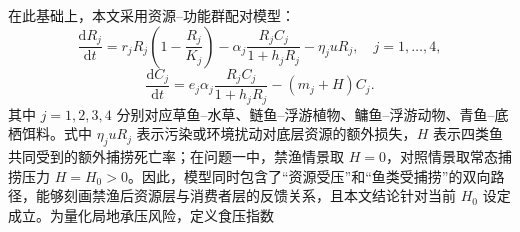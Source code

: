 \documentclass{MMCStyle}
\begin{document}
在此基础上，本文采用资源--功能群配对模型：
\begin{equation}
\frac{\mathrm{d}R_j}{\mathrm{d}t}
=r_j R_j\left(1-\frac{R_j}{K_j}\right)-\alpha_j\frac{R_j C_j}{1+h_jR_j}-\eta_j u R_j,\quad j=1,\dots,4,
\end{equation}
\begin{equation}
\frac{\mathrm{d}C_j}{\mathrm{d}t}
=e_j\alpha_j\frac{R_j C_j}{1+h_jR_j}-(m_j+H)C_j.
\end{equation}
其中 $j=1,2,3,4$ 分别对应草鱼--水草、鲢鱼--浮游植物、鳙鱼--浮游动物、青鱼--底栖饵料。式中 $\eta_j u R_j$ 表示污染或环境扰动对底层资源的额外损失，$H$ 表示四类鱼共同受到的额外捕捞死亡率；在问题一中，禁渔情景取 $H=0$，对照情景取常态捕捞压力 $H=H_0>0$。因此，模型同时包含了“资源受压”和“鱼类受捕捞”的双向路径，能够刻画禁渔后资源层与消费者层的反馈关系，且本文结论针对当前 $H_0$ 设定成立。为量化局地承压风险，定义食压指数
\end{document}
